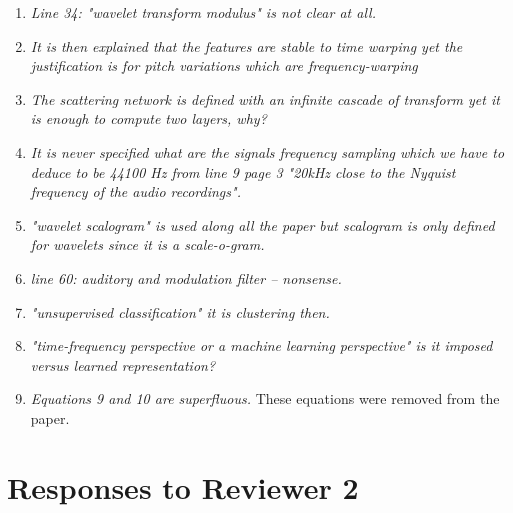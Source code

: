 \documentclass[10pt]{article}
\begin{document}
\begin{enumerate}
\item \emph{Line 34: "wavelet transform modulus" is not clear at all.}

\item \emph{It is then explained that the features are stable to time warping yet the justification is for pitch variations which are frequency-warping}

\item \emph{The scattering network is defined with an infinite cascade of transform yet it is enough to compute two layers, why?}

\item \emph{It is never specified what are the signals frequency sampling which we have to deduce to be 44100 Hz from line 9 page 3 "20kHz close to the Nyquist frequency of the audio recordings".}

\item \emph{"wavelet scalogram" is used along all the paper but scalogram is only defined for wavelets since 
it is a scale-o-gram.}

\item \emph{line 60: auditory and modulation filter – nonsense.}

\item \emph{"unsupervised classification" it is clustering then.}

\item \emph{"time-frequency perspective or a machine learning perspective" is it imposed versus learned representation? }

\item \emph{Equations 9 and 10 are superfluous.}
These equations were removed from the paper.

\end{enumerate}

\section{Responses to Reviewer 2}
\end{document}

